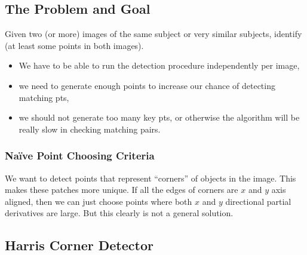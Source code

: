 \documentclass[11pt]{article}
\begin{document}
\subsection{The Problem and Goal}
Given two (or more) images of the same subject or very similar subjects, identify (at least some points in both images).
\begin{itemize}
	\item We have to be able to run the detection procedure independently per image,
	\item we need to generate enough points to increase our chance of detecting matching pts, 
	\item we should not generate too many key pts, or otherwise the algorithm will be really slow in checking matching pairs. 
\end{itemize}
 
\subsubsection{Na\"ive Point Choosing Criteria}
We want to detect points that represent ``corners'' of objects in the image. This makes these patches more unique. If all the edges of corners are $x$ and $y$ axis aligned, then we can just choose points where both $x$ and $y$ directional partial derivatives are large. But this clearly is not a general solution. 

\subsection{Harris Corner Detector}
\end{document}
